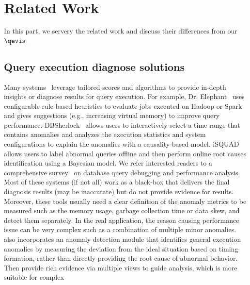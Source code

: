 \section{Related Work}\label{sec:rel}
In this part, we servery the related work and discuss their differences from our $\qevis$.  



\subsection{Query execution diagnose solutions}
Many systems~\cite{elephant, ma2020diagnosing, yoon2016dbsherlock, teoh2019perfdebug, liu2020fluxinfer, jeyakumar2019explainit, cloudera-manager} leverage tailored scores and algorithms to provide in-depth insights or diagnose results for query execution. 
For example, Dr. Elephant~\cite{elephant} uses configurable rule-based heuristics to evaluate jobs executed on Hadoop or Spark and gives suggestions (e.g., increasing virtual memory) to improve query performance. 
DBSherlock~\cite{yoon2016dbsherlock} allows users to interactively select a time range that contains anomalies and analyzes the execution statistics and system configurations to explain the anomalies with a causality-based model.
iSQUAD~\cite{ma2020diagnosing} allows users to label abnormal queries offline and then perform online root causes identification using a Bayesian model.
We refer interested readers to a comprehensive survey~\cite{gathani2020debugging} on database query debugging and performance analysis. 
Most of these systems (if not all) work as a black-box that delivers the final diagnosis results (may be inaccurate) but do not provide evidence for results.
Moreover, these tools usually need a clear definition of the anomaly metrics to be measured such as the memory usage, garbage collection time or data skew, and detect them separately. In the real application, the reason causing performance issue can be very complex such as a combination of multiple minor anomalies. 
\qevis{} also incorporates an anomaly detection module that identifies general execution anomalies by measuring the deviation from the ideal situation based on timing formation, rather than directly providing the root cause of abnormal behavior. Then provide  rich evidence via multiple views to guide analysis, which is more suitable for complex

